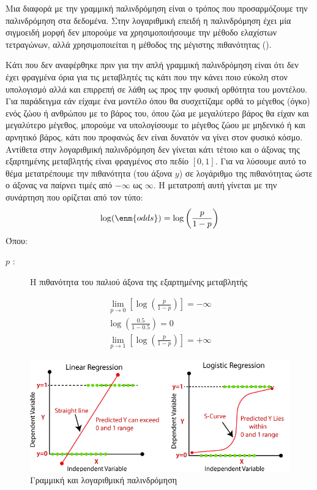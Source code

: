Μια διαφορά με την
γραμμική παλινδρόμηση είναι ο τρόπος που προσαρμόζουμε την παλινδρόμηση στα
δεδομένα. Στην λογαριθμική επειδή η παλινδρόμηση έχει μία σιγμοειδή μορφή δεν
μπορούμε να χρησιμοποιήσουμε την μέθοδο ελαχίστων τετραγώνων, αλλά χρησιμοποιείται
η μέθοδος της μέγιστης πιθανότητας ().

Κάτι που δεν αναφέρθηκε πριν για την απλή γραμμική παλινδρόμηση είναι ότι δεν έχει
φραγμένα όρια για τις μεταβλητές τις κάτι που την κάνει ποιο εύκολη στον υπολογισμό αλλά
και επιρρεπή σε λάθη ως προς την φυσική ορθότητα του μοντέλου. Για παράδειγμα εάν
είχαμε ένα μοντέλο όπου θα συσχετίζαμε ορθά το μέγεθος (όγκο) ενός ζώου ή ανθρώπου με
το βάρος του, όπου ζώα με μεγαλύτερο βάρος θα είχαν και μεγαλύτερο μέγεθος, μπορούμε
να υπολογίσουμε το μέγεθος ζώου με μηδενικό ή και αρνητικό βάρος, κάτι που προφανώς
δεν είναι δυνατόν να γίνει στον φυσικό κόσμο. Αντίθετα στην λογαριθμική παλινδρόμηση δεν
γίνεται κάτι τέτοιο και ο άξονας της εξαρτημένης μεταβλητής είναι φραγμένος στο πεδίο $[0,1]$.
Για να λύσουμε αυτό το θέμα μετατρέπουμε την πιθανότητα (του άξονα $y$) σε λογάριθμο της
πιθανότητας ώστε ο άξονας να παίρνει τιμές από $-\infty$ ως $\infty$. Η μετατροπή αυτή γίνεται με
την συνάρτηση  που ορίζεται από τον τύπο:
$$\log(\enm{odds})=\log\left(\frac{p}{1-p}\right)$$
Όπου:
\begin{description}
    \item[$p$ :] Η πιθανότητα του παλιού άξονα της εξαρτημένης μεταβλητής
\end{description}
\begin{gather*}
    \lim\limits_{p\rightarrow0}\left[\log\left(\frac{p}{1-p}\right)\right]=-\infty \\
    \log\left(\frac{0.5}{1-0.5}\right)=0\\
    \lim\limits_{p\rightarrow1}\left[\log\left(\frac{p}{1-p}\right)\right]=+\infty
\end{gather*}

\begin{figure}[H]
    \centering
    \includegraphics[width=1\textwidth]{images/linear-regression-vs-logistic-regression.png}
    \caption{Γραμμική και λογαριθμική παλινδρόμηση}
\end{figure}

